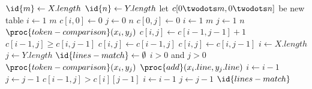 \begin{codebox}
\li $\id{m} \gets X.length$
\li $\id{n} \gets Y.length$
\li let $c[0 \twodots m, 0 \twodots n]$ be new table
\li \For $i \gets 1$ \To $m$ \Do
\li $c[i,0] \gets 0$ \End
\li \For $j \gets 0$ \To $n$ \Do
\li $c[0,j] \gets 0$ \End
\li \For $i \gets 1$ \To $m$ \Do
\li \For $j \gets 1$ \To $n$ \Do
\li \If $\proc{token-comparison}(x_i, y_j)$ \Then
\li $c[i,j] \gets c[i-1,j-1]+1$
\li \ElseIf $c[i-1,j] \geq c[i,j-1]$ \Then
\li $c[i,j] \gets c[i-1,j]$
\li \ElseNoIf $c[i,j] \gets c[i,j-1]$ \End \End \End
\li $i \gets X.length$
\li $j \gets Y.length$
\li $\id{lines-match} \gets \emptyset$
\li \While $i > 0$ and $j > 0$ \Do
\li \If $\proc{token-comparison}(x_i, y_j)$ \Then
\li $\proc{add}(x_i.line, y_j.line)$
\li $i \gets i - 1$
\li $j \gets j - 1$
\li \ElseIf $c[i-1,j] > c[i][j-1]$ \Then
\li $i \gets i - 1$
\li \ElseNoIf $j \gets j - 1$ \End \End
\li \Return $\id{lines-match}$
\end{codebox}